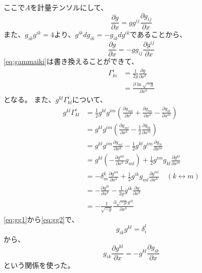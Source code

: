 \documentclass{jsarticle}
\newcommand{\pder}[2][]{\frac{\partial#1}{\partial#2}}
\begin{document}
ここで$A$を計量テンソルにして、
\begin{equation}
    \frac{\partial{g}}{\partial{x}} = gg^{ij}\frac{\partial{g_{ij}}}{\partial{x}} 
\end{equation}
また、$g_{ik}g^{ik}=4$より、$g^{ik}dg_{ik}=-g_{ik}dg^{ik}$であることから、
\begin{equation}
    \frac{\partial{g}}{\partial{x}} = -gg_{ij}\frac{\partial{g^{ij}}}{\partial{x}} 
\end{equation}
\eqref{eq:gammaiki}は書き換えることができて、
\begin{align}
    \Gamma^{i}_{ki} &= \frac{1}{2g}\pder[g]{x^k}\\%
                    &= \pder[\ln{\sqrt{-g}}]{x^k}
\end{align}
となる。
また、$g^{kl}\Gamma^{i}_{kl}$について、
\begin{align}
    g^{kl}\Gamma^{i}_{kl} &=
    \frac{1}{2}g^{kl}g^{im} 
    \left(
    \frac{\partial{g_{mk}}}{\partial{x^{l}}}
     +
    \frac{\partial{g_{lm}}}{\partial{x^{k}}}
     -
    \frac{\partial{g_{lk}}}{\partial{x^{m}}}
    \right)\\
    &=
    g^{kl}g^{im} 
    \left(
    \frac{\partial{g_{ml}}}{\partial{x^{k}}}
     -
    \frac{1}{2}\frac{\partial{g_{lk}}}{\partial{x^{m}}}
    \right)\\
    &= 
    g^{kl}g^{im} 
    \frac{\partial{g_{ml}}}{\partial{x^{k}}}
     -
    \frac{1}{2}
    g^{kl}g^{im} 
    \frac{\partial{g_{lk}}}{\partial{x^{m}}}\label{eq:gg1}\\
    &= 
    g^{kl}\left(- \pder[g^{im}]{x^{k}}g_{ml}\right)
    +
    \frac{1}{2}g^{im}g_{kl}\pder[g^{kl}]{x^{m}}\label{eq:gg2}\\
    &=
    - \delta^{k}_{m} \pder[g^{im}]{x^k} + \frac{1}{2}g^{ik}g_{ml}\pder[g^{ml}]{x^{k}} 
    \quad\left(k \leftrightarrow m\right)\\
    &=
    - \pder[g^{ik}]{x^k} - \frac{1}{2g}g^{ik}\pder[g]{x^{k}}\\
    &=
    - \frac{1}{\sqrt{-g}}\pder[\sqrt{-g}g^{ik}]{x^{k}}
\end{align}
\eqref{eq:gg1}から\eqref{eq:gg2}で、
\begin{equation}
    g_{ik}g^{kl} = \delta^l_i
\end{equation}
から、
\begin{equation}
    g_{ik}\pder[g^{kl}]{x} = - g^{kl}\pder[g_{ik}]{x}
\end{equation}
という関係を使った。
\end{document}
